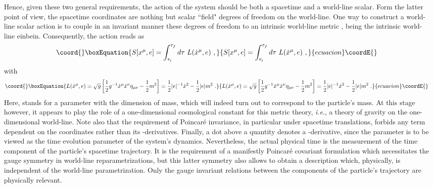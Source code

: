 \documentclass[a4paper,11pt]{article}
\begin{document}
Hence, given these two general requirements, the action of the system
should be both a spacetime and a world-line scalar. Form the latter
point of view, the spacetime coordinates \coordHE{} are nothing
but scalar ``field" degrees of freedom on the world-line. One way to
construct a world-line scalar action is to couple in an invariant
manner these degrees of freedom to an intrinsic world-line metric
\coordHE{}, \coordHE{} being the intrinsic world-line einbein.
Consequently, the action reads as
\begin{equation}\coord{}\boxEquation{
S[x^\mu,e]=\int_{\tau_i}^{\tau_f}d\tau\ L(\dot{x}^\mu,e)\ ,
}{
S[x^\mu,e]=\int_{\tau_i}^{\tau_f}d\tau\ L(\dot{x}^\mu,e)\ ,
}{ecuacion}\coordE{}\end{equation}
with
\begin{equation}\coord{}\boxEquation{
L(\dot{x}^\mu,e)=\sqrt{g}\left[\frac{1}{2}g^{-1}\dot{x}^\mu\dot{x}^\nu
\eta_{\mu\nu}-\frac{1}{2}m^2\right]=
\frac{1}{2}|e|^{-1}\dot{x}^2-\frac{1}{2}|e|m^2\ .
}{
L(\dot{x}^\mu,e)=\sqrt{g}\left[\frac{1}{2}g^{-1}\dot{x}^\mu\dot{x}^\nu
\eta_{\mu\nu}-\frac{1}{2}m^2\right]=
\frac{1}{2}|e|^{-1}\dot{x}^2-\frac{1}{2}|e|m^2\ .
}{ecuacion}\coordE{}\end{equation}
Here, \coordHE{} stands for a parameter with the dimension of mass, which
will indeed turn out to correspond to the particle's mass. At this stage
however, it appears to play the role of a one-dimensional cosmological
constant for this metric theory, {\it i.e.\/}, a theory of gravity on the 
one-dimensional world-line. Note also that the requirement of Poincar\'e 
invariance, in particular under spacetime translations, forbids any term 
dependent on the coordinates \coordHE{} rather than its \myHighlight{$\tau$}\coordHE{}-derivatives. 
Finally, a dot above a quantity denotes a \myHighlight{$\tau$}\coordHE{}-derivative, since the 
parameter \myHighlight{$\tau$}\coordHE{} is to be viewed as the time evolution parameter of the 
system's dynamics. Nevertheless, the actual physical time is the measurement 
of the time component \coordHE{} of the particle's spacetime trajectory. It is 
the requirement of a manifestly Poincar\'e covariant formulation which 
necessitates the gauge symmetry in world-line reparametrizations, but this
latter symmetry also allows to obtain a description which, physically, is 
independent of the world-line parametrization. Only the gauge invariant 
relations between the components of the particle's trajectory 
\coordHE{} are physically relevant.
\end{document}
